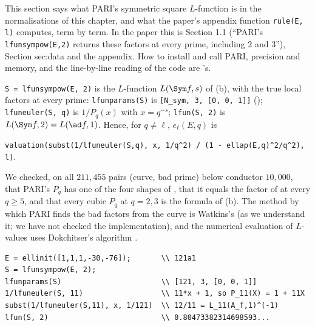 This section says what PARI's symmetric square $L$-function is in the normalisations of this chapter, and what the paper's appendix function \texttt{rule(E, l)}
computes, term by term. In the paper this is Section 1.1 (``PARI's \texttt{lfunsympow(E,2)} returns these factors at every prime, including $2$ and $3$''), Section
sec:data and the appendix. How to install and call PARI, precision and memory, and the line-by-line reading of the code are 's.

\begin{remark}\label{rem:lfunctions:pari}
\texttt{S = lfunsympow(E, 2)} is the $L$-function $L(\Sym f,s)$ of (b), with the true local factors at every prime: \texttt{lfunparams(S)} is
\texttt{[N\_sym, 3, [0, 0, 1]]} (); \texttt{lfuneuler(S, q)} is $1/P_q(x)$ with $x=q^{-s}$; \texttt{lfun(S, 2)} is $L(\Sym f,2)=L(\ad f,1)$. Hence, for $q\ne\ell$, $e_\ell(E,q)$ is
\begin{center}
\texttt{valuation(subst(1/lfuneuler(S,q), x, 1/q\^{}2) / (1 - ellap(E,q)\^{}2/q\^{}2), l)}.
\end{center}
We checked, on all $211{,}455$ pairs (curve, bad prime) below conductor $10{,}000$, that PARI's $P_q$ has one of the four shapes of , that
it equals the factor of  at every $q\ge5$, and that every cubic $P_q$ at $q=2,3$ is the formula of (b). The method by which PARI finds the bad factors from the curve is Watkins's \cite{Watkins02} (as we understand it; we have not checked the
implementation), and the numerical evaluation of $L$-values uses Dokchitser's algorithm \cite{Dokchitser04}.
\end{remark}

\begin{lstlisting}[language=GP]
E = ellinit([1,1,1,-30,-76]);       \\ 121a1
S = lfunsympow(E, 2);
lfunparams(S)                       \\ [121, 3, [0, 0, 1]]
1/lfuneuler(S, 11)                  \\ 11*x + 1, so P_11(X) = 1 + 11X
subst(1/lfuneuler(S,11), x, 1/121)  \\ 12/11 = L_11(A_f,1)^(-1)
lfun(S, 2)                          \\ 0.80473382314698593...
\end{lstlisting}

